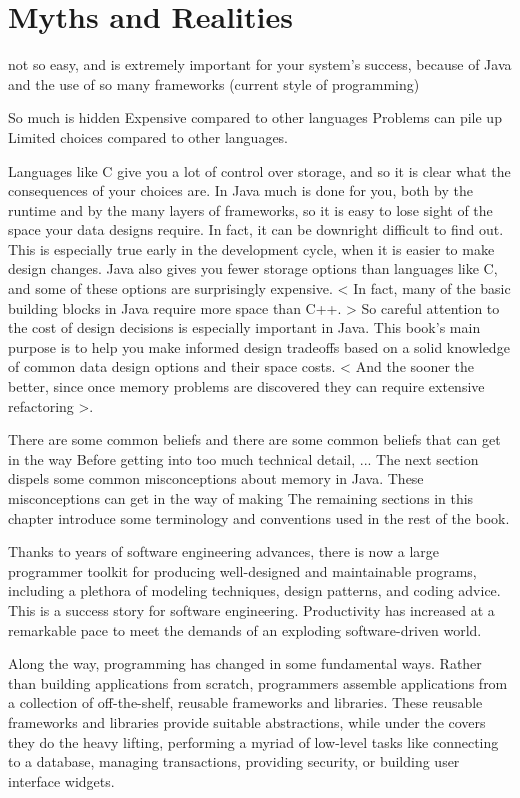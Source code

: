 \section{Myths and Realities}

not so easy, and is extremely important for your system's success, because of Java and the use of so
many frameworks (current style of programming)

So much is hidden
Expensive compared to other languages
Problems can pile up
Limited choices compared to other languages.

Languages like C give you a lot of control over storage, and so it is clear what
the consequences of your choices are. In Java much is done for you, both by the runtime and by the many layers of frameworks, so it is easy to lose sight of the space your data designs require. In fact, it can be downright difficult to find out. This is especially true early in the development cycle, when it is easier to make design changes.  Java also gives you fewer storage options than languages like C, and some of these options are surprisingly expensive. < In fact, many of the basic building blocks in Java require more space than C++. > So careful attention to the cost of design decisions is especially important in Java.  This book's main purpose is to help you make informed design tradeoffs based on a solid knowledge of common data design options and their space costs.  < And the sooner the better, since once memory problems are discovered they can require extensive
refactoring >. 

There are some common beliefs and there are some common beliefs that can get in the way 
Before getting into too much technical detail, ... The next section dispels some common misconceptions about memory in Java.  These misconceptions can get in the way of making  The remaining sections in this chapter introduce some terminology and conventions used in the rest of the book.

Thanks to years of software engineering advances, there is now a large
programmer toolkit for producing well-designed and maintainable programs,
including a plethora of modeling techniques, design patterns, and coding 
advice. This is a success story for software engineering. Productivity has
increased at a remarkable pace to meet the demands of an exploding software-driven world. 

Along the way, programming has changed in some fundamental ways. Rather than building applications from scratch, programmers 
assemble applications from a collection of off-the-shelf, reusable frameworks
and libraries. These reusable frameworks and libraries provide suitable
abstractions, while under the covers they do the heavy lifting, performing a
myriad of low-level tasks like connecting to a database, managing transactions,
providing security, or building user interface widgets.

